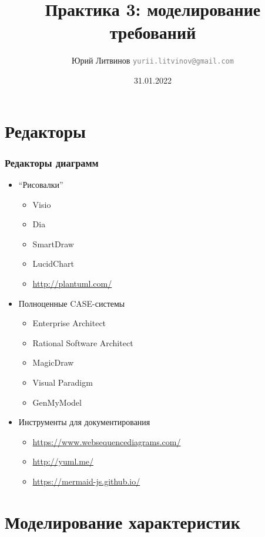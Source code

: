 \documentclass[xetex,mathserif,serif]{beamer}
\title{Практика 3: моделирование требований}
\author[Юрий Литвинов]{Юрий Литвинов \newline \textcolor{gray}{\small\texttt{yurii.litvinov@gmail.com}}}
\date{31.01.2022}
\begin{document}
    
    \frame{\titlepage}

    \section{Редакторы}

    \begin{frame}
        \frametitle{Редакторы диаграмм}
        \begin{itemize}
            \item ``Рисовалки''
            \begin{itemize}
                \item Visio
                \item Dia
                \item SmartDraw
                \item LucidChart
                \item \url{http://plantuml.com/}
            \end{itemize}
            \item Полноценные CASE-системы
            \begin{itemize}
                \item Enterprise Architect
                \item Rational Software Architect
                \item MagicDraw
                \item Visual Paradigm
                \item GenMyModel
            \end{itemize}
            \item Инструменты для документирования
            \begin{itemize}
                \item \url{https://www.websequencediagrams.com/}
                \item \url{http://yuml.me/}
                \item \url{https://mermaid-js.github.io/}
            \end{itemize}
        \end{itemize}
    \end{frame}


    \section{Моделирование характеристик}
\end{document}
